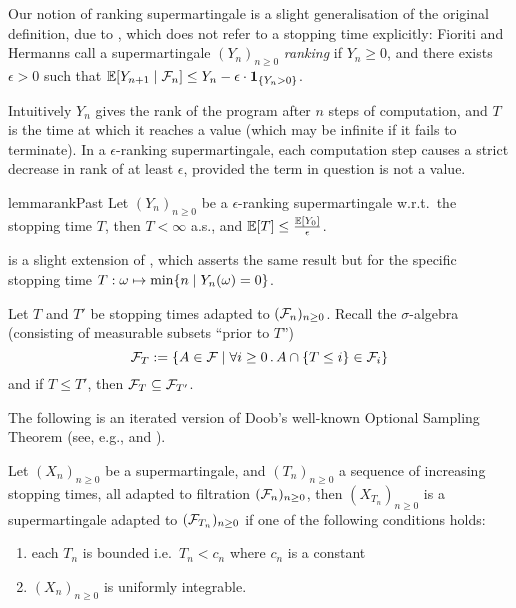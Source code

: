 \begin{remark}
Our notion of ranking supermartingale is a slight generalisation of the original definition, due to \cite{DBLP:conf/cav/ChakarovS13,DBLP:conf/popl/FioritiH15}, which does not refer to a stopping time explicitly:
Fioriti and Hermanns call a supermartingale $(Y_n)_{n \geq 0}$ \emph{ranking} if $Y_n \geq 0$, and there exists $\epsilon > 0$ such that $\mathbb{E}[Y_{n+1} \mid \mathcal{F}_n] \leq Y_n - \epsilon \cdot {\bf 1}_{\{Y_n > 0\}}$.
\end{remark}

Intuitively $Y_n$ gives the rank of the program after $n$ steps of computation, and $T$ is the time at which it reaches a value (which may be infinite if it fails to terminate).
In a $\epsilon$-ranking supermartingale, each computation step causes a strict decrease in rank of at least $\epsilon$, provided the term in question is not a value.

\begin{restatable}{lemma}{rankPast}
\label{lem:rank-PAST}
Let $(Y_n)_{n \geq 0}$ be a $\epsilon$-ranking supermartingale w.r.t.~the stopping time $T$, then $T < \infty$ a.s., and $\mathbb{E}[T] \leq \frac{\mathbb{E}[Y_0]}{\epsilon}$.
\end{restatable}

\begin{remark}
 is a slight extension of \cite[Lemma 5.5]{DBLP:conf/popl/FioritiH15},
which asserts the same result but for the specific stopping time $T : \omega \mapsto \min\{n \mid Y_n(\omega) = 0\}$.
\end{remark}

Let $T$ and $T'$ be stopping times adapted to $(\mathcal{F}_n)_{n \geq 0}$.
Recall the $\sigma$-algebra (consisting of measurable subsets ``prior to $T$'')
\[
\mathcal{F}_T := \{A \in \mathcal{F} \mid \forall i \geq 0 \, . \, A \cap \{T \leq i\} \in \mathcal{F}_i\}
\]
and if $T \leq T'$, then $\mathcal{F}_{T} \subseteq \mathcal{F}_{T'}$.

The following is an iterated version of Doob's well-known Optional Sampling Theorem (see, e.g., \cite[\S 6.7]{AshDD00} and \cite[Thm.~7.2]{DBLP:conf/popl/FioritiH15}).
\begin{theorem}
\label{thm:optional sampling}
Let $(X_n)_{n \geq 0}$ be a supermartingale, and $(T_n)_{n \geq 0}$ a sequence of increasing stopping times, all adapted to filtration $(\mathcal{F}_n)_{n \geq 0}$, then $(X_{T_n})_{n \geq 0}$ is a supermartingale adapted to $(\mathcal{F}_{T_n})_{n \geq 0}$ if one of the following conditions holds:
\begin{enumerate}
\item each $T_n$ is bounded i.e.~$T_n < c_n$ where $c_n$ is a constant
\item $(X_n)_{n \geq 0}$ is uniformly integrable.
\end{enumerate}
\end{theorem}

